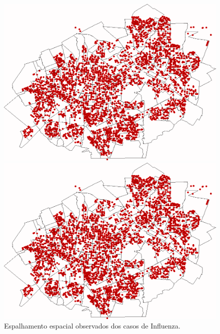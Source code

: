 \begin{figure}[H]
\begin{minipage}{.45\textwidth}
    \centering
    \includegraphics[width=1.0\textwidth]{Figuras/Resultados/Observado/01-11-2009.png}
    \captionsetup{labelformat=empty}
  \end{minipage}%
  \begin{minipage}{.45\textwidth}
    \centering
    \includegraphics[width=1.0\textwidth]{Figuras/Resultados/Observado/01-12-2009.png}
    \captionsetup{labelformat=empty}
  \end{minipage}
  \caption{Espalhamento espacial observados dos casos de Influenza.}
  \label{fig:espacial_observado_0002}
\end{figure}

\newpage
